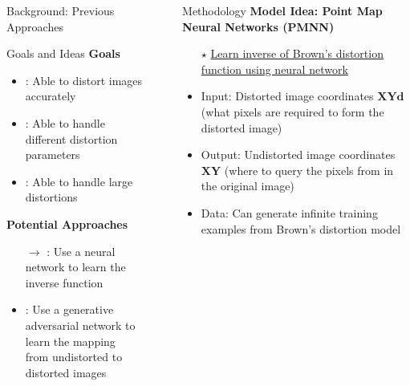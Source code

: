 \documentclass[final,16pt]{beamer}
\newlength{\sepwidth}
\newlength{\colwidth}
\newcommand{\separatorcolumn}{\begin{column}{\sepwidth}\end{column}}
\begin{document}
\begin{frame}[t]
\begin{columns}[t]
\begin{column}{\colwidth}
\begin{block}{Background: Previous Approaches}
      \end{block}

      \begin{block}{Goals and Ideas}
        \textbf{Goals}
        \begin{itemize}
          \item {}: Able to distort images accurately
          \item {}: Able to handle different distortion parameters
          \item {}: Able to handle large distortions
        \end{itemize}

        \textbf{Potential Approaches}
        \begin{itemize}
          \item[$\rightarrow$] : Use a neural network to learn the inverse function
          \item {}: Use a generative adversarial network to learn the mapping \\
                \makebox[7.25cm][l]{} from undistorted to distorted images
        \end{itemize}
      \end{block}



    \end{column}

    \separatorcolumn

    \begin{column}{\colwidth}

      \begin{block}{Methodology}
        \textbf{Model Idea: Point Map Neural Networks (PMNN)}
        \begin{itemize}
          \item[$\star$] \underline{Learn inverse of Brown's distortion function using neural network}
          \item Input: Distorted image coordinates $\mathbf{XYd}$ (what pixels are required to form the distorted image)
          \item Output: Undistorted image coordinates $\mathbf{XY}$ (where to query the pixels from in the original image)
          \item Data: Can generate infinite training examples from Brown's distortion model
        \end{itemize}
        \vspace{-1cm}


\end{block}
\end{column}
\end{columns}
\end{frame}
\end{document}
